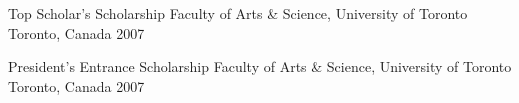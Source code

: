 \begin{cvhonors}
  \cvhonor
    {Top Scholar's Scholarship} %
    {Faculty of Arts \& Science, University of Toronto} %
    {Toronto, Canada} %
    {2007} %
    
  \cvhonor
    {President's Entrance Scholarship} %
    {Faculty of Arts \& Science, University of Toronto } %
    {Toronto, Canada} %
    {2007} %
    

\end{cvhonors}


